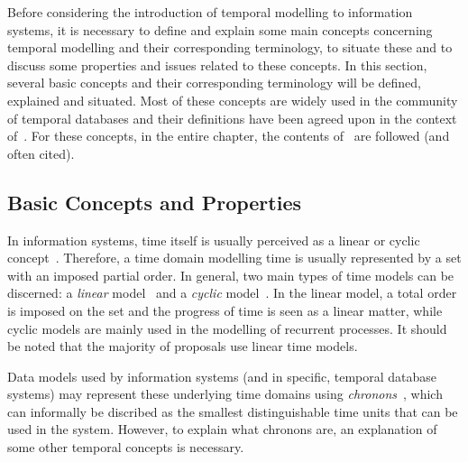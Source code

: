 %
%
Before considering the introduction of temporal modelling to information systems, it is necessary to define and explain some main concepts concerning temporal modelling and their corresponding terminology, to situate these and to discuss some properties and issues related to these concepts. In this section, several basic concepts and their corresponding terminology will be defined, explained and situated. Most of these concepts are widely used in the community of temporal databases and their definitions have been agreed upon in the context of~\cite{Dyreson1994}. For these concepts, in the entire chapter, the contents of~\cite{Dyreson1994} are followed (and often cited).





\subsection{Basic Concepts and Properties}
\label{subsec:basic-concepts}
In information systems, time itself is usually perceived as a linear or cyclic concept~\cite{Jensen94thetsql2}. Therefore, a time domain modelling time is usually represented by a set with an imposed partial order. In general, two main types of time models can be discerned: a \emph{linear} model~\cite{benthem82} and a \emph{cyclic} model~\cite{lorentzos88}. In the linear model, a total order is imposed on the set and the progress of time is seen as a linear matter, while cyclic models are mainly used in the modelling of recurrent processes. It should be noted that the majority of proposals use linear time models.

Data models used by information systems (and in specific, temporal database systems) may represent these underlying time domains using \emph{chronons}~\cite{Dyreson1994}, which can informally be discribed as the smallest distinguishable time units that can be used in the system. However, to explain what chronons are, an explanation of some other temporal concepts is necessary.

